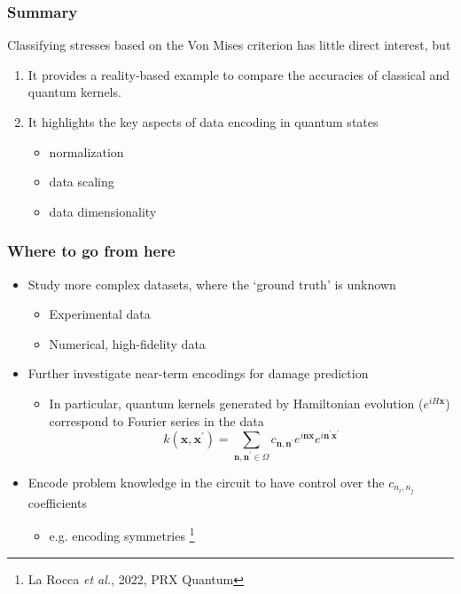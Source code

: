 \documentclass{beamer}
\begin{document}
    \begin{frame}
        \frametitle{Summary}
    
        Classifying stresses based on the Von Mises criterion has little direct interest, but
        \begin{enumerate}
            \pause
            \item It provides a reality-based example to compare the accuracies of classical and quantum kernels.
            \pause
            \item It highlights the key aspects of data encoding in quantum states
            \begin{itemize}
                \item normalization
                \item data scaling
                \item data dimensionality
            \end{itemize} 
        \end{enumerate}
    
    \end{frame}
    
    \begin{frame}
        \frametitle{Where to go from here}
        
        \begin{itemize}
            \item Study more complex datasets, where the `ground truth' is unknown
            \begin{itemize}
                \item Experimental data
                \item Numerical, high-fidelity data
            \end{itemize} 
            \pause
            \item Further investigate near-term encodings for damage prediction
            \begin{itemize}
                \item In particular, quantum kernels generated by Hamiltonian evolution ($e^{iH \mathbf{x}}$) correspond to Fourier series in the data
                $$
                    k\left( \mathbf{x}, \mathbf{x}^\prime \right) = \sum_{\mathbf{n}, \mathbf{n}^\prime \in \Omega} c_{\mathbf{n}, \mathbf{n}^\prime} e^{i \mathbf{n}\mathbf{x}} e^{i \mathbf{n}^\prime\mathbf{x}^\prime}
                $$
                
            \end{itemize}
            \pause
            \item Encode problem knowledge in the circuit to have control over the $c_{n_i,n_j}$ coefficients
            \begin{itemize}
                \item e.g. encoding symmetries \footnote{La Rocca \emph{et al.}, 2022, PRX Quantum} 
            \end{itemize}
        \end{itemize}
        
    \end{frame}
    
\end{document}
